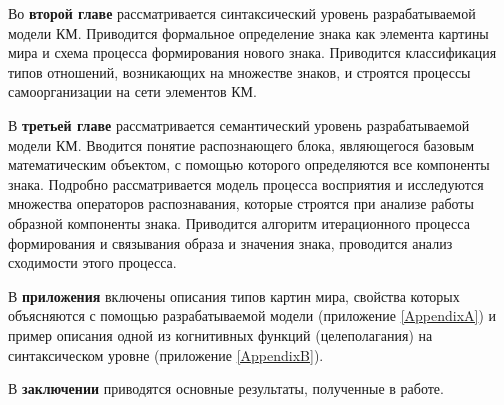 Во \textbf{второй главе} рассматривается синтаксический уровень разрабатываемой модели КМ. Приводится формальное определение знака как элемента картины мира и схема процесса формирования нового знака. Приводится классификация типов отношений, возникающих на множестве знаков, и строятся процессы самоорганизации на сети элементов КМ.

В \textbf{третьей главе} рассматривается семантический уровень разрабатываемой модели КМ. Вводится понятие распознающего блока, являющегося базовым математическим объектом, с помощью которого определяются все компоненты знака. Подробно рассматривается модель процесса восприятия и исследуются множества операторов распознавания, которые строятся при анализе работы образной компоненты знака. Приводится алгоритм итерационного процесса формирования и связывания образа и значения знака, проводится анализ сходимости этого процесса.

В \textbf{приложения} включены описания типов картин мира, свойства которых объясняются с помощью разрабатываемой модели (приложение \ref{AppendixA}) и пример описания одной из когнитивных функций (целеполагания) на синтаксическом уровне (приложение \ref{AppendixB}).

В \textbf{заключении} приводятся основные результаты, полученные в работе.
\clearpage